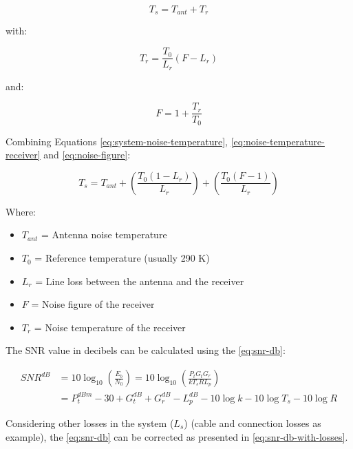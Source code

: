 \begin{equation} \label{eq:system-noise-temperature}
    T_{s} = T_{ant} + T_{r}
\end{equation}

with:

\begin{equation} \label{eq:noise-temperature-receiver}
    T_{r} = \frac{T_{0}}{L_{r}} (F - L_{r})
\end{equation}

and:

\begin{equation} \label{eq:noise-figure}
    F = 1 + \frac{T_{r}}{T_{0}}
\end{equation}

Combining Equations \ref{eq:system-noise-temperature}, \ref{eq:noise-temperature-receiver} and \ref{eq:noise-figure}:

\begin{equation} \label{eq:system-noise-temp-expanded}
    T_{s} = T_{ant} + \left( \frac{T_{0}(1 - L_{r})}{L_{r}} \right) + \left( \frac{T_{0} (F - 1)}{L_{r}} \right)
\end{equation}

Where:

\begin{itemize}
    \item $T_{ant}$ = Antenna noise temperature
    \item $T_{0}$ = Reference temperature (usually 290 K)
    \item $L_{r}$ = Line loss between the antenna and the receiver
    \item $F$ = Noise figure of the receiver
    \item $T_{r}$ = Noise temperature of the receiver
\end{itemize}

The SNR value in decibels can be calculated using the \autoref{eq:snr-db}:

\begin{equation} \label{eq:snr-db}
    \begin{split}
        SNR^{dB} & = 10\log_{10}\left( \frac{E_{b}}{N_{0}} \right) = 10\log_{10} \left( \frac{P_{t}G_{t}G_{r}}{kT_{s}RL_{p}} \right) \\
                 & = P_{t}^{dBm} - 30 + G_{t}^{dB} + G_{r}^{dB} - L_{p}^{dB} - 10\log k - 10\log T_{s} - 10\log R
    \end{split}
\end{equation}

Considering other losses in the system ($L_{s}$) (cable and connection losses as example), the \autoref{eq:snr-db} can be corrected as presented in \autoref{eq:snr-db-with-losses}.

